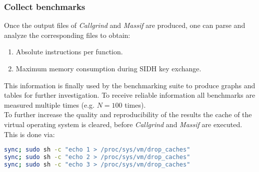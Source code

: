 \subsubsection{Collect benchmarks}
Once the output files of \textit{Callgrind} and \textit{Massif} are produced, one can parse and analyze the corresponding files to obtain:
\begin{enumerate}
\item Absolute instructions per function.
\item Maximum memory consumption during \gls{SIDH} key exchange.
\end{enumerate}
This information is finally used by the benchmarking suite to produce graphs and tables for further investigation. To receive reliable information all benchmarks are measured multiple times (e.g. $N=100$ times).\\
To further increase the quality and reproducibility of the results the cache of the virtual operating system is cleared, before \textit{Callgrind} and \textit{Massif} are executed. This is done via:
\begin{lstlisting}[language=Bash]
sync; sudo sh -c "echo 1 > /proc/sys/vm/drop_caches"
sync; sudo sh -c "echo 2 > /proc/sys/vm/drop_caches"
sync; sudo sh -c "echo 3 > /proc/sys/vm/drop_caches"
\end{lstlisting}


